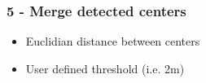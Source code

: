 \documentclass[aspectratio=169]{beamer}
\begin{document}
{
\begin{frame}[plain]
\end{frame}}


\begin{frame}
  \frametitle{5 - Merge detected centers}
\begin{center}
\begin{itemize}
 \item Euclidian distance between centers 
 \item User defined threshold (i.e. 2m)
\end{itemize}
\end{center}
\end{frame}

\end{document}
